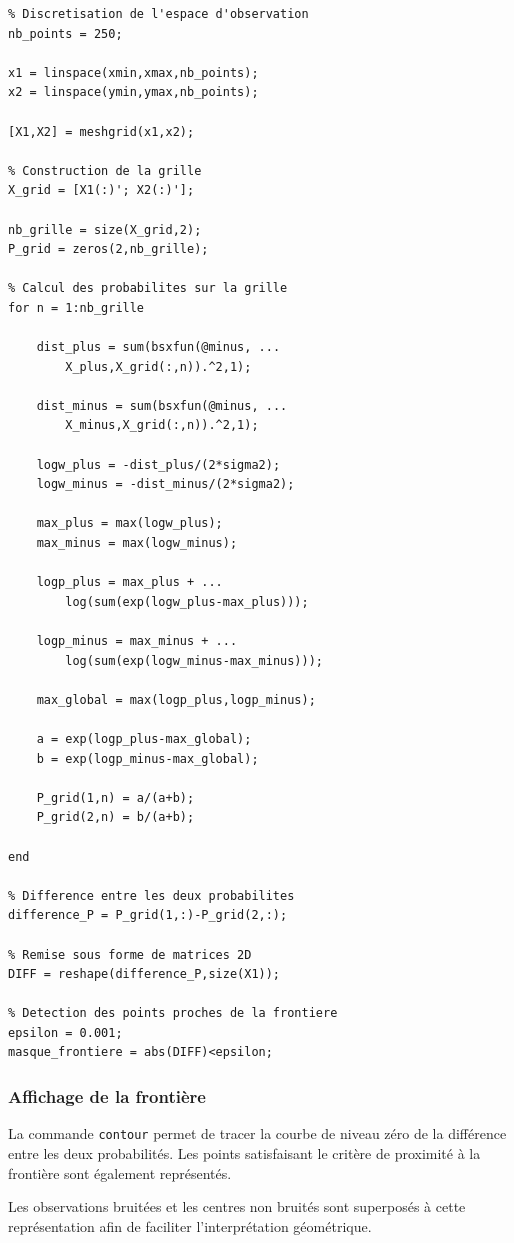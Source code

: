 \begin{verbatim}
% Discretisation de l'espace d'observation
nb_points = 250;

x1 = linspace(xmin,xmax,nb_points);
x2 = linspace(ymin,ymax,nb_points);

[X1,X2] = meshgrid(x1,x2);

% Construction de la grille
X_grid = [X1(:)'; X2(:)'];

nb_grille = size(X_grid,2);
P_grid = zeros(2,nb_grille);

% Calcul des probabilites sur la grille
for n = 1:nb_grille

    dist_plus = sum(bsxfun(@minus, ...
        X_plus,X_grid(:,n)).^2,1);

    dist_minus = sum(bsxfun(@minus, ...
        X_minus,X_grid(:,n)).^2,1);

    logw_plus = -dist_plus/(2*sigma2);
    logw_minus = -dist_minus/(2*sigma2);

    max_plus = max(logw_plus);
    max_minus = max(logw_minus);

    logp_plus = max_plus + ...
        log(sum(exp(logw_plus-max_plus)));

    logp_minus = max_minus + ...
        log(sum(exp(logw_minus-max_minus)));

    max_global = max(logp_plus,logp_minus);

    a = exp(logp_plus-max_global);
    b = exp(logp_minus-max_global);

    P_grid(1,n) = a/(a+b);
    P_grid(2,n) = b/(a+b);

end

% Difference entre les deux probabilites
difference_P = P_grid(1,:)-P_grid(2,:);

% Remise sous forme de matrices 2D
DIFF = reshape(difference_P,size(X1));

% Detection des points proches de la frontiere
epsilon = 0.001;
masque_frontiere = abs(DIFF)<epsilon;
\end{verbatim}

\subsubsection{Affichage de la frontière}

La commande \texttt{contour} permet de tracer la courbe
de niveau zéro de la différence entre les deux
probabilités. Les points satisfaisant le critère de
proximité à la frontière sont également représentés.

Les observations bruitées et les centres non bruités
sont superposés à cette représentation afin de faciliter
l'interprétation géométrique.

